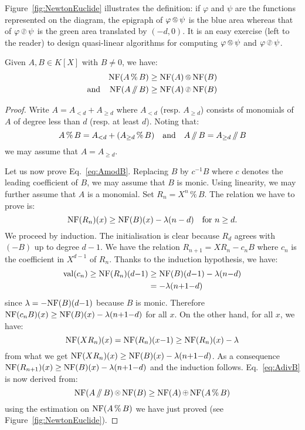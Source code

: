 \documentclass{sig-alternate-05-2015}
\DeclareMathOperator{\val}{val}
\newcommand{\NF}{\text{\rm NF}}
\renewcommand{\mod}{\,\%\,}
\renewcommand{\div}{\,/\hspace{-0.3em}/\,}
\newcommand{\nfop}[1]{%
\raisebox{-0.1mm}{\begin{tikzpicture}
\draw[transparent] (-0.18,0)--(0.18,0);
\draw[very thin] (0,0) circle (0.11cm);
\begin{scope}
\clip (0,0) circle (0.11cm);
\node[scale=0.75] at (0,0) { $#1$ };
\end{scope}
\end{tikzpicture}}}
\newcommand{\nfplus}{\nfop+}
\newcommand{\nftimes}{\nfop\times}
\newcommand{\nfmod}{\nfop\mod}
\newcommand{\nfdiv}{\nfop\div}
\begin{document}
Figure~\ref{fig:NewtonEuclide} illustrates the definition: if $\varphi$ 
and $\psi$ are the functions represented on the diagram, the epigraph of 
$\varphi \nfmod \psi$ is the blue area whereas that of $\varphi \nfdiv \psi$ 
is the green area translated by $(-d,0)$.
It is an easy exercise (left to the reader) to design quasi-linear
algorithms for computing $\varphi \nfmod \psi$ and $\varphi \nfdiv \psi$.

\begin{theo}
\label{theo:EDivisionNP}
Given $A, B \in K[X]$ with $B \neq 0$, we have:
\begin{align}
\NF(A \mod B) & \geq \NF(A) \nfmod \NF(B) \label{eq:AmodB} \\
\text{and} \hspace{4mm}
\NF(A \div B) & \geq \NF(A) \nfdiv \NF(B) \label{eq:AdivB}
\end{align}
\end{theo}

\begin{proof}
Write $A = A_{<d} + A_{\geq d}$ where $A_{<d}$ (resp. $A_{\geq d}$)
consists of monomials of $A$ of degree less than $d$ (resp. at least
$d$). Noting that:
$$A \mod B = A_{<d} + (A_{\geq d} \mod B)
\quad \text{and} \quad
A \div B = A_{\geq d} \div B$$
we may assume that $A = A_{\geq d}$.

Let us now prove Eq.~\eqref{eq:AmodB}. 
Replacing $B$ by $c^{-1} B$ where $c$ denotes the leading coefficient
of $B$, we may assume that $B$ is monic. Using linearity, we may further
assume that $A$ is a monomial. Set $R_n = X^n \mod B$. The relation
we have to prove is:
$$\NF(R_n)(x) \geq \NF(B)(x) - \lambda(n-d)
\quad \text{for } n\geq d.$$
We proceed by induction. The initialisation is clear because $R_d$
agrees with $(-B)$ up to degree $d{-}1$. We have the relation
$R_{n+1} = X R_n - c_n B$
where $c_n$ is the coefficient in $X^{d-1}$ of $R_n$. Thanks to the
induction hypothesis, we have:
\begin{align*}
\val(c_n) \geq \NF(R_n)(d{-}1) & \geq \NF(B)(d{-}1) - \lambda(n{-}d) \\
& = - \lambda(n{+}1{-}d)
\end{align*}
since $\lambda = -\NF(B)(d{-}1)$ because $B$ is monic. Therefore
$\NF(c_n B)(x) \geq \NF(B)(x) - \lambda(n{+}1{-}d)$ for all $x$. On the 
other hand, for all $x$, we have:
$$\NF(X R_n)(x) = \NF(R_n)(x{-}1) \geq \NF(R_n)(x) - \lambda$$
from what we get $\NF(X R_n)(x) \geq \NF(B)(x) - \lambda(n{+}1{-}d)$. As a
consequence
$\NF(R_{n+1})(x) \geq \NF(B)(x) - \lambda(n{+}1{-}d)$
and the induction follows.
Eq.~\eqref{eq:AdivB} is now derived from:
$$\NF(A \div B) \nftimes \NF(B) \geq \NF(A) \nfplus \NF(A \mod B)$$
using the estimation on $\NF(A\mod B)$ we have just proved
(see Figure~\ref{fig:NewtonEuclide}).
\end{proof}
\end{document}
